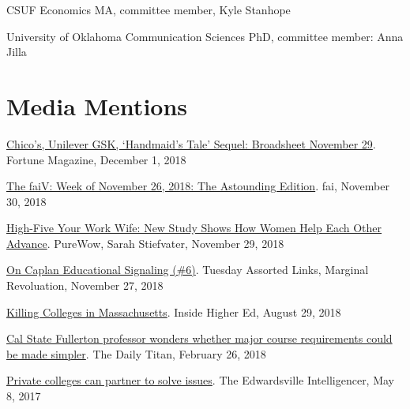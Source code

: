 \documentclass[11pt,a4paper,serif]{moderncv}
\begin{document}
CSUF Economics MA, committee member, Kyle Stanhope



University of Oklahoma Communication Sciences PhD, committee member: Anna Jilla



\section{Media Mentions}  
  
 \begin{hangparas}{.25in}{1} 
 \href{http://fortune.com/2018/11/29/chicos-unilever-gsk-handmaids-tale-sequel-broadsheet-november-29/?xid=gn_editorspicks}{Chico's, Unilever GSK, `Handmaid's Tale' Sequel: Broadsheet November 29}. Fortune Magazine, December 1, 2018



\href{https://mailchi.mp/financialaccess/the-faiv-week-of-nov262018}{The faiV: Week of November 26, 2018: The Astounding Edition}. fai, November 30, 2018



\href{https://www.purewow.com/news/west-point-study-on-women-helping-each-other-at-work}{High-Five Your Work Wife: New Study Shows How Women Help Each Other Advance}. PureWow, Sarah Stiefvater, November 29, 2018



\href{https://marginalrevolution.com/marginalrevolution/2018/11/tuesday-assorted-links-191.html}{On Caplan Educational Signaling (\#6)}. Tuesday Assorted Links, Marginal Revoluation, November 27, 2018



\href{https://www.insidehighered.com/views/2018/08/29/state-policy-makers-should-stop-overlooking-role-private-colleges-providing-access}{Killing Colleges in Massachusetts}. Inside Higher Ed, August 29, 2018



\href{https://dailytitan.com/2018/02/cal-state-fullerton-professor-wonders-whether-major-course-requirements-made-simpler/}{Cal State Fullerton professor wonders whether major course requirements could be made simpler}. The Daily Titan, February 26, 2018



\href{http://www.theintelligencer.com/news/article/Private-colleges-can-partner-to-solve-issues-11129681.php}{Private colleges can partner to solve issues}. The Edwardsville Intelligencer, May 8, 2017




\end{hangparas}
\end{document}
